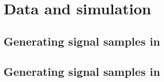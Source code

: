 \section{Data and simulation}
\label{sec:svj_data_sim}


\subsection{Generating signal samples in \texorpdfstring{\PYTHIA}{Pythia}}
\label{subsec:svj_signal_pythia}


\subsection{Generating signal samples in \texorpdfstring{\MADGRAPH}{MadGraph}}
\label{subsec:svj_signal_madgraph}

